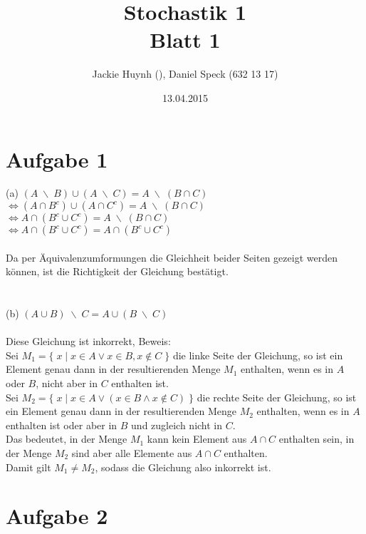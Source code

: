 \documentclass[10pt,a4paper]{article}
\title{\textbf{\huge Stochastik 1
\\\large Blatt 1}}
\author{Jackie Huynh (\qquad\qquad), Daniel Speck (632 13 17)}
\date{13.04.2015}
\newcommand{\bs}{\;\backslash\;}
\begin{document}
	\maketitle


	\section*{Aufgabe 1}
	
		(a) \quad
		$(A \bs B) \cup (A \bs C) = A \bs (B \cap C)$
		\\
		$\Leftrightarrow (A \cap B^c) \cup (A \cap C^c) = A \bs (B \cap C)$
		\\
		$\Leftrightarrow A \cap (B^c \cup C^c) = A \bs (B \cap C)$
		\\
		$\Leftrightarrow A \cap (B^c \cup C^c) = A \cap (B^c \cup C^c)$
		\\
		\\
		Da per Äquivalenzumformungen die Gleichheit beider Seiten gezeigt werden können, ist die Richtigkeit der Gleichung bestätigt.
		\\
		\\
		\\
		(b) \quad
		$(A \cup B) \bs C = A \cup (B \bs C)$
		\\
		\\
		Diese Gleichung ist inkorrekt, Beweis:
		\\
		Sei $M_1 = \{\; x \;|\; x \in A \lor x \in B, x \not\in C \;\}$ die linke Seite der Gleichung, so ist ein Element genau dann in der resultierenden Menge $M_1$ enthalten, wenn es in $A$ oder $B$, nicht aber in $C$ enthalten ist.
		\\
		Sei $M_2 = \{\; x \;|\; x \in A \lor (x \in B \land x \not\in C) \;\}$ die rechte Seite der Gleichung, so ist ein Element genau dann in der resultierenden Menge $M_2$ enthalten, wenn es in $A$ enthalten ist oder aber in $B$ und zugleich nicht in $C$.
		\\
		Das bedeutet, in der Menge $M_1$ kann kein Element aus $A \cap C$ enthalten sein, in der Menge $M_2$ sind aber alle Elemente aus $A \cap C$ enthalten.
		\\
		Damit gilt $M_1 \neq M_2$, sodass die Gleichung also inkorrekt ist.
		
		\begin{flushright}
			\text{$\Box$}
		\end{flushright}


	\section*{Aufgabe 2}
\end{document}
